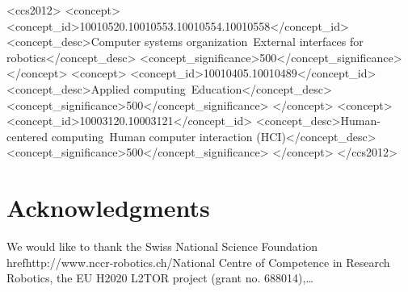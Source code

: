\documentclass{sig-alternate-05-2015}
\begin{document}
%
%
 \begin{CCSXML}
	<ccs2012>
	<concept>
	<concept_id>10010520.10010553.10010554.10010558</concept_id>
	<concept_desc>Computer systems organization~External interfaces for robotics</concept_desc>
	<concept_significance>500</concept_significance>
	</concept>
	<concept>
	<concept_id>10010405.10010489</concept_id>
	<concept_desc>Applied computing~Education</concept_desc>
	<concept_significance>500</concept_significance>
	</concept>
	<concept>
	<concept_id>10003120.10003121</concept_id>
	<concept_desc>Human-centered computing~Human computer interaction (HCI)</concept_desc>
	<concept_significance>500</concept_significance>
	</concept>
	</ccs2012>
\end{CCSXML}


%
%

%
%
\printccsdesc




\section{Acknowledgments}
We would like to thank the Swiss National Science Foundation href{http://www.nccr-robotics.ch/}{National Centre of Competence in Research Robotics}, the EU H2020 L2TOR project (grant no. 688014),\dots


  
\end{document}
